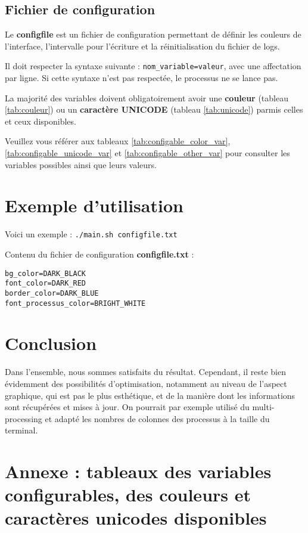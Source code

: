 \documentclass{article}
\begin{document}
\subsection{Fichier de configuration}
Le \textbf{configfile} est un fichier de configuration permettant de définir les couleurs de l'interface, l'intervalle pour l'écriture et la réinitialisation du fichier de logs.
  
Il doit respecter la syntaxe suivante : \texttt{nom\_variable=valeur}, avec une affectation par ligne. Si cette syntaxe n'est pas respectée, le processus ne se lance pas.
\vspace{1em}

La majorité des variables doivent obligatoirement avoir une \textbf{couleur} (tableau \ref{tab:couleur}) ou un \textbf{caractère UNICODE} (tableau \ref{tab:unicode}) parmis celles et ceux disponibles.
  
Veuillez vous référer aux tableaux \ref{tab:configable_color_var}, \ref{tab:configable_unicode_var} et \ref{tab:configable_other_var} pour consulter les variables possibles ainsi que leurs valeurs.

\section{Exemple d'utilisation}
Voici un exemple : \texttt{./main.sh configfile.txt}
  
\vspace{0.5em}
Contenu du fichier de configuration \textbf{configfile.txt} :
\begin{verbatim}
bg_color=DARK_BLACK
font_color=DARK_RED
border_color=DARK_BLUE
font_processus_color=BRIGHT_WHITE
\end{verbatim}


\section{Conclusion}
Dans l'ensemble, nous sommes satisfaits du résultat. Cependant, il reste bien évidemment des possibilités d'optimisation, notamment au niveau de l'aspect graphique, qui est pas le plus esthétique,
et de la manière dont les informations sont récupérées et mises à jour. On pourrait par exemple utilisé du multi-processing et adapté les nombres de colonnes des processus à la taille du terminal.

\newpage
\section{Annexe : tableaux des variables configurables, des couleurs et caractères unicodes disponibles}
\vspace{3em}
\end{document}
